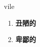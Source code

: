 
\begin{frame}
{\huge vile}
\begin{center}
\begin{enumerate}\Large
  \item \textbf{丑陋的}
  \item \textbf{卑鄙的}
\end{enumerate}
\end{center}
\end{frame}
